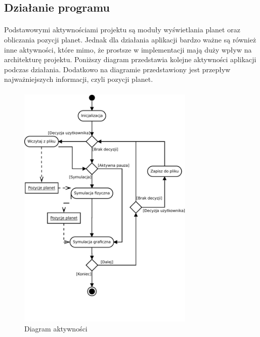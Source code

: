 \subsection{Działanie programu}\label{sub:dzialanie programu}
\paragraph{}

Podstawowymi aktywnościami projektu są moduły wyświetlania planet oraz obliczania pozycji planet. Jednak dla działania aplikacji bardzo ważne są również inne aktywności, które mimo, że prostsze w implementacji mają duży wpływ na architekturę projektu. Poniższy diagram przedstawia kolejne aktywności aplikacji podczas działania. Dodatkowo na diagramie przedstawiony jest przepływ najważniejszych informacji, czyli pozycji planet.

\paragraph{}

\begin{figure}[ht!]
	\centering
	\includegraphics[width=0.75\textwidth]{activity.pdf}
	\caption{Diagram aktywności}
	\label{fig:activity}
\end{figure}


